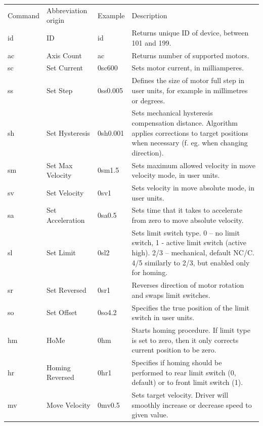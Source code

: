 \documentclass[10pt,article]{article}
\begin{document}
\begin{table}[ht] \centering
\begin{tabularx}{\textwidth}{lllX}
\rowcolor[gray]{0.80} Command & Abbreviation origin & Example & Description\\
\rowcolor[gray]{0.90} id & ID & id & Returns unique ID of device, between 101 and 199.\\
\rowcolor[gray]{0.95} ac & Axis Count & ac & Returns number of supported motors.\\
\rowcolor[gray]{0.90} sc & Set Current & 0sc600 &Sets motor current, in milliamperes.\\
\rowcolor[gray]{0.95} ss & Set Step & 0ss0.005 & Defines the size of motor full step in user units, for example in millimetres or degrees. \\
\rowcolor[gray]{0.90} sh & Set Hysteresis & 0sh0.001 & Sets mechanical hysteresis compensation distance. Algorithm applies corrections to target positions when necessary (f. eg. when changing direction). \\
\rowcolor[gray]{0.95} sm & Set Max Velocity & 0sm1.5 & Sets maximum allowed velocity in move velocity mode, in user units. \\
\rowcolor[gray]{0.90} sv & Set Velocity & 0sv1 & Sets velocity in move absolute mode, in user units. \\
\rowcolor[gray]{0.95} sa & Set Acceleration & 0sa0.5 & Sets time that it takes to accelerate from zero to move absolute velocity. \\
\rowcolor[gray]{0.90} sl & Set Limit & 0sl2 & Sets limit switch type. 0 – no limit switch, 1 - active limit switch (active high). 2/3 – mechanical, default NC/C. 4/5 similarly to 2/3, but enabled only for homing. \\
\rowcolor[gray]{0.95} sr & Set Reversed & 0sr1 & Reverses direction of motor rotation and swaps limit switches. \\
\rowcolor[gray]{0.90} so & Set Offset & 0so4.2 & Specifies the true position of the limit switch in user units. \\
\rowcolor[gray]{0.95} hm & HoMe & 0hm & Starts homing procedure. If limit type is set to zero, then it only corrects current position to be zero. \\
\rowcolor[gray]{0.90} hr & Homing Reversed & 0hr1 & Specifies if homing should be performed to rear limit switch (0, default) or to front limit switch (1).\\
\rowcolor[gray]{0.95} mv & Move Velocity & 0mv0.5 & Sets target velocity. Driver will smoothly increase or decrease speed to given value. \\

\end{tabularx}
\end{table}
\end{document}
